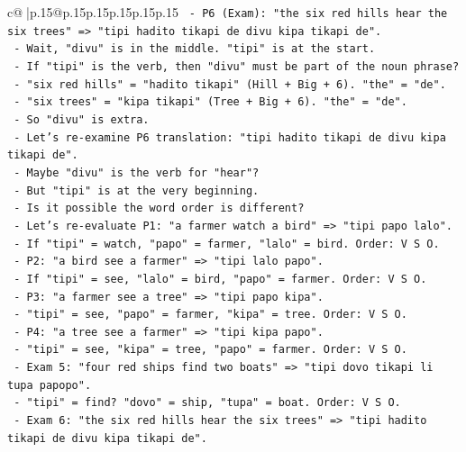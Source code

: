 \documentclass{article}
\begin{document}
{\begin{supertabular}{c@{$\;$}|p{.15\linewidth}@{}p{.15\linewidth}p{.15\linewidth}p{.15\linewidth}p{.15\linewidth}p{.15\linewidth}}
{{{\texttt{            {-} P6 (Exam): "the six red hills hear the six trees" => "tipi hadito tikapi de divu kipa tikapi de".} \\
\texttt{            {-} Wait, "divu" is in the middle. "tipi" is at the start.} \\
\texttt{            {-} If "tipi" is the verb, then "divu" must be part of the noun phrase?} \\
\texttt{            {-} "six red hills" = "hadito tikapi" (Hill + Big + 6). "the" = "de".} \\
\texttt{            {-} "six trees" = "kipa tikapi" (Tree + Big + 6). "the" = "de".} \\
\texttt{            {-} So "divu" is extra.} \\
\texttt{            {-} Let's re{-}examine P6 translation: "tipi hadito tikapi de divu kipa tikapi de".} \\
\texttt{            {-} Maybe "divu" is the verb for "hear"?} \\
\texttt{            {-} But "tipi" is at the very beginning.} \\
\texttt{            {-} Is it possible the word order is different?} \\
\texttt{            {-} Let's re{-}evaluate P1: "a farmer watch a bird" => "tipi papo lalo".} \\
\texttt{              {-} If "tipi" = watch, "papo" = farmer, "lalo" = bird. Order: V S O.} \\
\texttt{            {-} P2: "a bird see a farmer" => "tipi lalo papo".} \\
\texttt{              {-} If "tipi" = see, "lalo" = bird, "papo" = farmer. Order: V S O.} \\
\texttt{            {-} P3: "a farmer see a tree" => "tipi papo kipa".} \\
\texttt{              {-} "tipi" = see, "papo" = farmer, "kipa" = tree. Order: V S O.} \\
\texttt{            {-} P4: "a tree see a farmer" => "tipi kipa papo".} \\
\texttt{              {-} "tipi" = see, "kipa" = tree, "papo" = farmer. Order: V S O.} \\
\texttt{            {-} Exam 5: "four red ships find two boats" => "tipi dovo tikapi li tupa papopo".} \\
\texttt{              {-} "tipi" = find? "dovo" = ship, "tupa" = boat. Order: V S O.} \\
\texttt{            {-} Exam 6: "the six red hills hear the six trees" => "tipi hadito tikapi de divu kipa tikapi de".} \\
}}}
\end{supertabular}}
\end{document}
